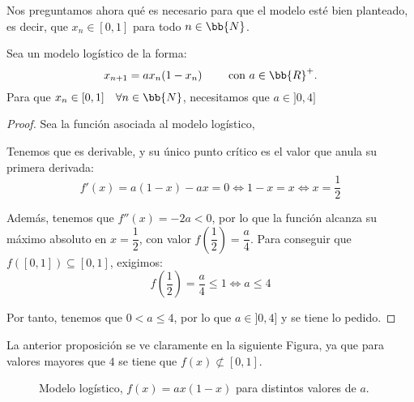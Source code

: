 Nos preguntamos ahora qué es necesario para que el modelo esté bien planteado, es decir, que $x_n\in [0,1]$ para todo $n\in \bb{N}$.
\begin{prop}
    Sea un modelo logístico de la forma:
    \begin{equation*}
        x_{n+1} = ax_n (1-x_n)\qquad \text{\ con\ } a\in \bb{R}^+.
    \end{equation*}
    Para que $x_n \in [0,1]\quad \forall n \in \bb{N}$, necesitamos que $a\in ]0,4]$
\end{prop}
\begin{proof}
    Sea la función asociada al modelo logístico,

    Tenemos que es derivable, y su único punto crítico es el valor que anula su primera derivada:
    \begin{equation*}
        f'(x)=a(1-x) -ax = 0 \Longleftrightarrow 1-x = x \Longleftrightarrow x=\frac{1}{2}
    \end{equation*}

    Además, tenemos que $f''(x)=-2a<0$, por lo que la función alcanza su máximo absoluto en $x = \dfrac{1}{2}$, con valor $f\left(\dfrac{1}{2}\right) = \dfrac{a}{4}$.
    Para conseguir que $f([0,1]) \subseteq [0,1]$, exigimos:
    \begin{equation*}
        f\left(\dfrac{1}{2}\right) = \dfrac{a}{4} \leq 1 \Longleftrightarrow a \leq 4
    \end{equation*}

    Por tanto, tenemos que $0<a\leq 4$, por lo que $a\in ]0,4]$ y se tiene lo pedido.
\end{proof}

La anterior proposición se ve claramente en la siguiente Figura, ya que para valores mayores que $4$ se tiene que $f(x)\not\subset [0,1]$.
\begin{figure}[H]
    \centering
    \caption{\centering Modelo logístico, $f(x)=ax(1-x)$ para distintos valores de $a$.}
\end{figure}

